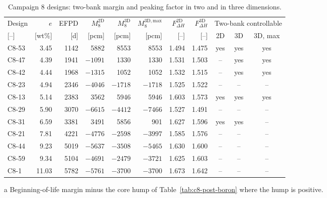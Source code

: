 \begin{table}[htbp]
  \centering
  \footnotesize
  \begin{threeparttable}
  \caption{Campaign 8 designs: two-bank margin and peaking factor in two and in three dimensions.}
  \label{tab:c8-twobank}
  \setlength{\tabcolsep}{3pt}\scriptsize
  \begin{tabular}{@{}l r r r r r r r c c c@{}}
    \toprule
    Design & $e$ & EFPD & $M_8^\mathrm{2D}$ & $M_8^\mathrm{3D}$ & $M_8^\mathrm{3D,max}$\tnote{a} &
      $F_{\Delta H}^\mathrm{2D}$ & $F_{\Delta H}^\mathrm{3D}$ &
      \multicolumn{3}{c}{Two-bank controllable} \\
    \cmidrule(l){9-11}
    {[--]} & [wt\%] & [d] & [pcm] & [pcm] & [pcm] & [--] & [--] & 2D & 3D & 3D, max \\
    \midrule
    C8-53 & 3.45  & 1142 & 5882   & 8553   & 8553   & 1.494 & 1.475 & yes & yes & yes \\
    C8-47 & 4.39  & 1941 & $-1091$ & 1330  & 1330   & 1.531 & 1.503 & --  & yes & yes \\
    C8-42 & 4.44  & 1968 & $-1315$ & 1052  & 1052   & 1.532 & 1.515 & --  & yes & yes \\
    C8-23 & 4.94  & 2346 & $-4046$ & $-1718$ & $-1718$ & 1.525 & 1.522 & -- & -- & -- \\
    C8-13 & 5.14  & 2383 & 3562   & 5946   & 5946   & 1.603 & 1.573 & yes & yes & yes \\
    C8-29 & 5.90  & 3070 & $-6615$ & $-4412$ & $-7466$ & 1.527 & 1.491 & -- & -- & -- \\
    C8-31 & 6.59  & 3381 & 3491   & 5856   & 901    & 1.627 & 1.596 & yes & yes & --  \\
    C8-21 & 7.81  & 4221 & $-4776$ & $-2598$ & $-3997$ & 1.585 & 1.576 & -- & -- & -- \\
    C8-44 & 9.23  & 5019 & $-5637$ & $-3508$ & $-5465$ & 1.630 & 1.600 & -- & -- & -- \\
    C8-59 & 9.34  & 5104 & $-4691$ & $-2479$ & $-3721$ & 1.625 & 1.603 & -- & -- & -- \\
    C8-1  & 11.03 & 5782 & $-5761$ & $-3700$ & $-3700$ & 1.673 & 1.642 & -- & -- & -- \\
    \bottomrule
  \end{tabular}
  \begin{tablenotes}[flushleft]\footnotesize
    \item[a] Beginning-of-life margin minus the core hump of
      Table~\ref{tab:c8-post-boron} where the hump is positive.
  \end{tablenotes}
  \end{threeparttable}
\end{table}

